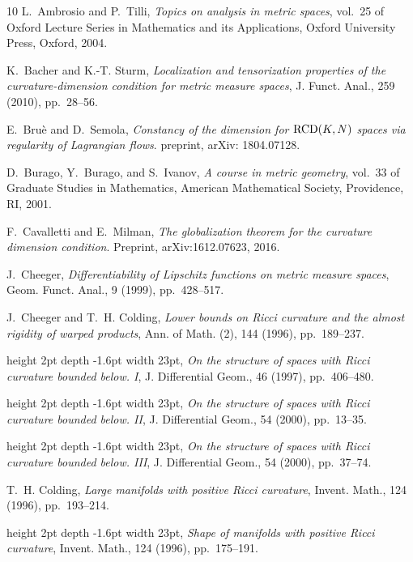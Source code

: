\documentclass[reqno,11pt]{article}
\numberwithin{equation}{section}
\begin{document}
\begin{thebibliography}{10}
{\sc L.~Ambrosio and P.~Tilli}, {\em Topics on analysis in metric spaces},
  vol.~25 of Oxford Lecture Series in Mathematics and its Applications, Oxford
  University Press, Oxford, 2004.

{\sc K.~Bacher and K.-T. Sturm}, {\em Localization and tensorization properties
  of the curvature-dimension condition for metric measure spaces}, J. Funct.
  Anal., 259 (2010), pp.~28--56.

{\sc E.~Bru\`e and D.~Semola}, {\em Constancy of the dimension for {${\rm
  RCD}(K,N)$} spaces via regularity of {L}agrangian flows}.
\newblock preprint, arXiv: 1804.07128.

{\sc D.~Burago, Y.~Burago, and S.~Ivanov}, {\em A course in metric geometry},
  vol.~33 of Graduate Studies in Mathematics, American Mathematical Society,
  Providence, RI, 2001.

{\sc F.~Cavalletti and E.~Milman}, {\em The globalization theorem for the
  curvature dimension condition}.
\newblock Preprint, arXiv:1612.07623, 2016.

{\sc J.~Cheeger}, {\em Differentiability of {L}ipschitz functions on metric
  measure spaces}, Geom. Funct. Anal., 9 (1999), pp.~428--517.

{\sc J.~Cheeger and T.~H. Colding}, {\em Lower bounds on {R}icci curvature and
  the almost rigidity of warped products}, Ann. of Math. (2), 144 (1996),
  pp.~189--237.

\leavevmode\vrule height 2pt depth -1.6pt width 23pt, {\em On the structure of
  spaces with {R}icci curvature bounded below. {I}}, J. Differential Geom., 46
  (1997), pp.~406--480.

\leavevmode\vrule height 2pt depth -1.6pt width 23pt, {\em On the structure of
  spaces with {R}icci curvature bounded below. {II}}, J. Differential Geom., 54
  (2000), pp.~13--35.

\leavevmode\vrule height 2pt depth -1.6pt width 23pt, {\em On the structure of
  spaces with {R}icci curvature bounded below. {III}}, J. Differential Geom.,
  54 (2000), pp.~37--74.

{\sc T.~H. Colding}, {\em Large manifolds with positive {R}icci curvature},
  Invent. Math., 124 (1996), pp.~193--214.

\leavevmode\vrule height 2pt depth -1.6pt width 23pt, {\em Shape of manifolds
  with positive {R}icci curvature}, Invent. Math., 124 (1996), pp.~175--191.


\end{thebibliography}
\end{document}
